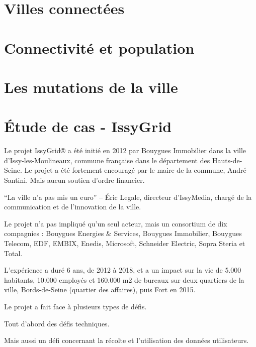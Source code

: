 
\section{Villes connectées}

\section{Connectivité et population}

\section{Les mutations de la ville}



\section{Étude de cas - IssyGrid}
Le projet IssyGrid® a été initié en 2012 par Bouygues Immobilier dans la ville d'Issy-les-Moulineaux,
commune française dans le département des Hauts-de-Seine. Le projet a été fortement encouragé par le 
maire de la commune, André Santini. Mais aucun soutien d'ordre financier.

``La ville n’a pas mis un euro'' --  Éric Legale, directeur d’IssyMedia, chargé de la communication et 
de l’innovation de la ville.

Le projet n'a pas impliqué qu'un seul acteur, mais un consortium de dix compagnies : 
Bouygues Energies \& Services, Bouygues Immobilier, Bouygues Telecom, EDF, EMBIX, Enedis, 
Microsoft, Schneider Electric, Sopra Steria et Total.

L'expérience a duré 6 ans, de 2012 à 2018, et a un impact sur la vie de 5.000 habitants, 10.000 employés 
et 160.000 m2 de bureaux sur deux quartiers de la ville, Bords-de-Seine (quartier des affaires), 
puis Fort en 2015.

Le projet a fait face à plusieurs types de défis. 

Tout d'abord des défis techniques. 

Mais aussi un défi concernant la récolte et l'utilisation des données utilisateurs.

